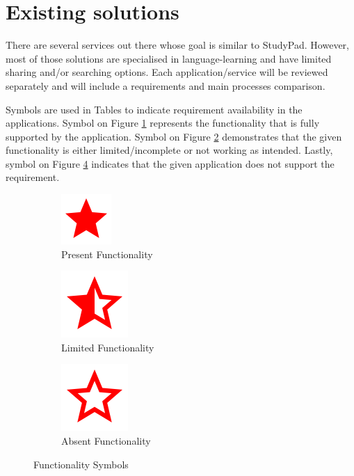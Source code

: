 \documentclass[thesis=B,english]{FITthesis}[2012/10/20]
\newcommand{\appname}{StudyPad}
\begin{document}
\newpage

\section{Existing solutions}

There are several services out there whose goal is similar to \appname. However, most of those solutions are specialised in language-learning and have limited sharing and/or searching options. Each application/service will be reviewed separately and will include a requirements and main processes comparison. 

Symbols are used in Tables  to indicate  requirement availability in the applications. Symbol on Figure \ref{fig:star} represents the functionality  that is fully supported by the application. Symbol on Figure \ref{fig:starhalf} demonstrates that the given functionality is either limited/incomplete or not working as intended. Lastly, symbol on Figure \ref{fig:starborder} indicates that the given application does not support the requirement.
 
\begin{figure}[H]
\centering
\begin{subfigure}{.3\textwidth}
  \centering
  \includegraphics[scale=0.2]{ic_star_black_24dp}
  \caption{Present Functionality}
  \label{fig:star}
\end{subfigure}%
\begin{subfigure}{.3\textwidth}
  \centering
  \includegraphics[scale=0.2]{ic_star_half_black_24dp.png}
  \caption{Limited Functionality}
  \label{fig:starhalf}
\end{subfigure}%
\begin{subfigure}{.3\textwidth}
  \centering
  \includegraphics[scale=0.2]{ic_star_border_black_24dp.png}
  \caption{Absent Functionality}
  \label{fig:starborder}
\end{subfigure}

\caption{Functionality  Symbols}
\end{figure}
\end{document}
